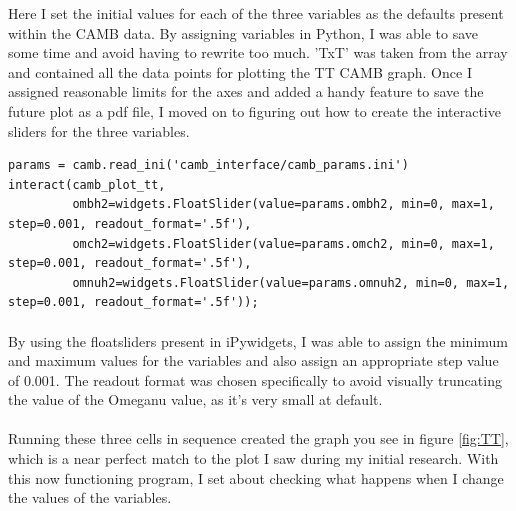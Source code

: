 \documentclass[twoside, fontsize=12pt,
     bibliography=totoc, %
     listof=totoc, %
     index=totoc, %
     onehalfspacing %
]{_MScDiss2017_cls}
\begin{document}

Here I set the initial values for each of the three variables as the defaults present within the CAMB data. By assigning variables in Python, I was able to save some time and avoid having to rewrite too much. 'TxT' was taken from the array and contained all the data points for plotting the TT CAMB graph. Once I assigned reasonable limits for the axes and added a handy feature to save the future plot as a pdf file, I moved on to figuring out how to create the interactive sliders for the three variables.



\begin{lstfloat}
\begin{lstlisting}[caption={Creating the first plot}, captionpos=b]
params = camb.read_ini('camb_interface/camb_params.ini')
interact(camb_plot_tt,
         ombh2=widgets.FloatSlider(value=params.ombh2, min=0, max=1, step=0.001, readout_format='.5f'),
         omch2=widgets.FloatSlider(value=params.omch2, min=0, max=1, step=0.001, readout_format='.5f'),
         omnuh2=widgets.FloatSlider(value=params.omnuh2, min=0, max=1, step=0.001, readout_format='.5f'));
\end{lstlisting}
\end{lstfloat}

\paragraph{}

By using the floatsliders present in iPywidgets, I was able to assign the minimum and maximum values for the variables and also assign an appropriate step value of 0.001. The readout format was chosen specifically to avoid visually truncating the value of the Omeganu value, as it's very small at default.

\paragraph{}

Running these three cells in sequence created the graph you see in figure \ref{fig:TT}, which is a near perfect match to the plot I saw during my initial research. With this now functioning program, I set about checking what happens when I change the values of the variables.
\end{document}
